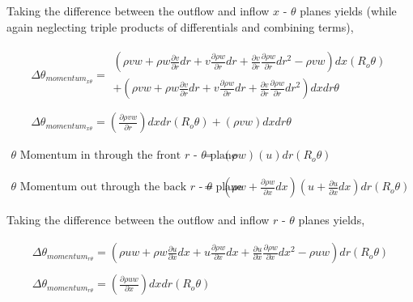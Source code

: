 	Taking the difference between the outflow and inflow $x$ - $\theta$ planes yields (while again neglecting
triple products of differentials and combining terms),

\begin{displaymath}
	\begin{array}{c}
	\Delta \theta_{momentum_{x \theta}}=
		\begin{array}{c}
	(\rho vw + \rho w \frac{\partial v}{\partial r}dr + 
	v \frac{\partial \rho w}{\partial r}dr + \frac{\partial v}{\partial r} \frac{\partial \rho w}{\partial r}dr^2 -
	\rho vw)dx(R_o \theta) \\
	 + (\rho vw + \rho w \frac{\partial v}{\partial r}dr + v \frac{\partial \rho w}{\partial r}dr + 
	\frac{\partial v}{\partial r} \frac{\partial \rho w}{\partial r}dr^2)dxdr \theta
		\end{array} \\ \\
	\Delta \theta_{momentum_{x \theta}}= (\frac{\partial \rho vw}{\partial r})dxdr (R_o \theta) + (\rho vw)dxdr \theta
	\end{array}
\end{displaymath}

\begin{displaymath}
	\begin{array}{ccc}
		\textrm{$\theta$ Momentum in through the front $r$ - $\theta$ plane} &
		= & (\rho w)(u)dr(R_o \theta)\\
 		& \\ & \\
		\textrm{$\theta$ Momentum out through the back $r$ - $\theta$ plane} &
		= & (\rho w + \frac{\partial \rho w}{\partial x}dx)(u + \frac{\partial u}{\partial x}dx)dr(R_o \theta) 
	\end{array}
\end{displaymath}

	Taking the difference between the outflow and inflow $r$ - $\theta$ planes yields,

\begin{displaymath}
	\begin{array}{c}
	\Delta \theta_{momentum_{r \theta}}=(\rho uw + \rho w \frac{\partial u}{\partial x}dx + 
	u \frac{\partial \rho w}{\partial x}dx +
	 \frac{\partial u}{\partial x} \frac{\partial\rho w}{\partial x}dx^2 - \rho uw)dr(R_o \theta) \\ \\
	\Delta \theta_{momentum_{r \theta}}=(\frac{\partial \rho uw}{\partial x})dxdr(R_o \theta)
	\end{array}
\end{displaymath}

